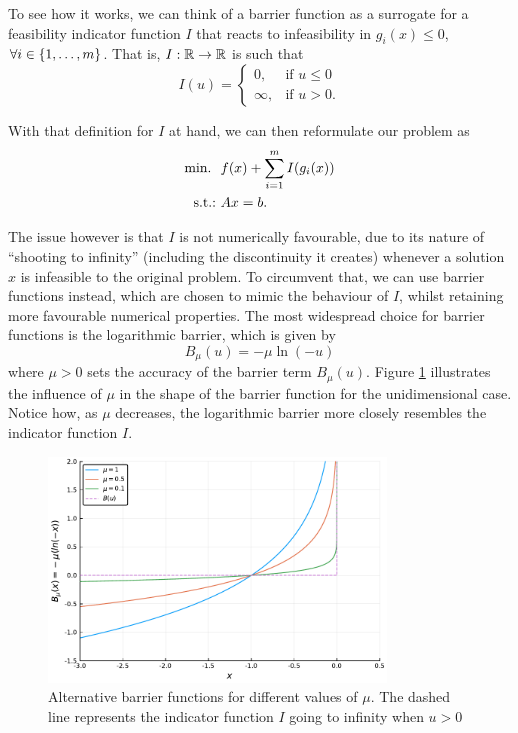 To see how it works, we can think of a barrier function as a surrogate for a feasibility indicator function $I$ that reacts to infeasibility in $g_i(x) \leq 0$, $\forall i \in  \left\{ 1,\dots, m \right \}$. That is, $I : \mathbb{R} \to \mathbb{R}$ is such that
	\begin{equation*}
	I(u) = \begin{cases} 0, &\text{if } u \leq 0 \\
	                     \infty, &\text{if } u > 0.  
	       \end{cases}
	\end{equation*} 

With that definition for $I$ at hand, we can then reformulate our problem as	
	\begin{align*}
		\mathop{\text{min.~}} \ & f(x) + \sum_{i=1}^m I(g_i(x)) \\
		\mathop{\text{s.t.:~}} &Ax = b. 
	\end{align*}
	
The issue however is that $I$ is not numerically favourable, due to its nature of ``shooting to infinity'' (including the discontinuity it creates) whenever a solution $x$ is infeasible to the original problem. To circumvent that, we can use barrier functions instead, which are chosen to mimic the behaviour of $I$, whilst retaining more favourable numerical properties. The most widespread choice for barrier functions is the logarithmic barrier, which is given by
	\begin{equation*}
		B_\mu(u) = -\mu \ln(-u)
	\end{equation*}
	where $\mu > 0$ sets the accuracy of the barrier term $B_\mu(u)$. Figure \ref{p1c7:fig:barrier_function} illustrates the influence of $\mu$ in the shape of the barrier function for the unidimensional case. Notice how, as $\mu$ decreases, the logarithmic barrier more closely resembles the indicator function $I$.
	
\begin{figure}
	\includegraphics[width=0.8\textwidth]{part_1/chapter_7/figures/different_mu.pdf}
	\caption{Alternative barrier functions for different values of $\mu$. The dashed line represents the indicator function $I$ going to infinity when $u > 0$} \label{p1c7:fig:barrier_function}
\end{figure}

